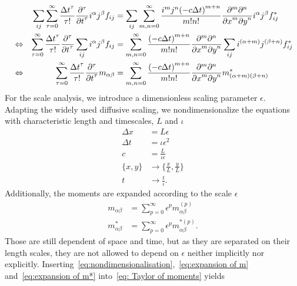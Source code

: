 \documentclass{article}
\begin{document}
\begin{align}
    \nonumber
    & & \sum_{ij} \sum_{\tau = 0}^\infty \frac{{\Delta t}^\tau }{\tau!} \frac{\partial^\tau}{{\partial t}^\tau} i^\alpha j^\beta f_{ij} &=
    \sum_{ij}\sum_{m,n = 0}^\infty \frac{i^m j^n {(-c\Delta t)}^{m+n}} {m!n!} \frac{\partial^m \partial^n}{ {\partial x}^m{\partial y}^n}i^\alpha j^\beta f^*_{ij}\\
    \nonumber
    &\Leftrightarrow &
    \sum_{\tau = 0}^\infty \frac{{\Delta t}^\tau }{\tau!} \frac{\partial^\tau}{{\partial t}^\tau} \sum_{ij}i^\alpha j^\beta f_{ij} &=
    \sum_{m,n = 0}^\infty \frac{{(-c\Delta t)}^{m+n}} {m!n!} \frac{\partial^m \partial^n}{ {\partial x}^m{\partial y}^n}\sum_{ij}i^{(\alpha + m)} j^{(\beta+n)} f^*_{ij}\\
      \label{eq: Taylor of moments}
     &\Leftrightarrow &
     \sum_{\tau = 0}^\infty \frac{{\Delta t}^\tau }{\tau!} \frac{\partial^\tau}{{\partial t}^\tau} m_{\alpha\beta} &=
    \sum_{m,n = 0}^\infty \frac{{(-c\Delta t)}^{m+n}} {m!n!} \frac{\partial^m \partial^n}{ {\partial x}^m{\partial y}^n} m^*_{(\alpha + m)(\beta + n)}
\end{align}
For the scale analysis, we introduce a dimensionless scaling parameter $\epsilon$.
Adapting the widely used diffusive scaling, we nondimensionalize the equations with characteristic length and timescales, $L$ and $\iota$
\begin{equation}
  \label{eq:nondimensionalisation}
  \begin{aligned}
    \Delta x & = L\epsilon \\
    \Delta t & = \iota\epsilon^2 \\
    c & = \frac{L}{\iota\epsilon} \\
    \{x, y\} & \rightarrow \{\frac{x}{L}, \frac{y}{L}\} \\
    t & \rightarrow \frac{t}{\iota}.
  \end{aligned}
\end{equation}
Additionally, the moments are expanded according to the scale $\epsilon$
\begin{align}
    \label{eq:expansion of m}
    m_{\alpha\beta} & = \sum_{p=0}^{\infty} \epsilon^p m_{\alpha\beta}^{(p)} \\
    \label{eq:expansion of m*}
    m^*_{\alpha\beta} & = \sum_{p=0}^{\infty} \epsilon^p m_{\alpha\beta}^{*(p)}.
\end{align}
Those are still dependent of space and time, but as they are separated on their length scales, they are not allowed to depend on $\epsilon$ neither implicitly nor explicitly.
Inserting~\eqref{eq:nondimensionalisation},~\eqref{eq:expansion of m} and~\eqref{eq:expansion of m*} into~\eqref{eq: Taylor of moments} yields
\end{document}

